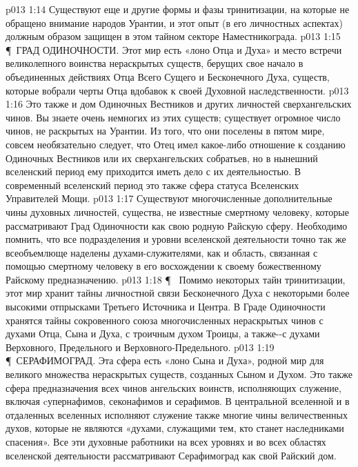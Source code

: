 \vs p013 1:14 Существуют еще и другие формы и фазы тринитизации, на которые не обращено внимание народов Урантии, и этот опыт (в его личностных аспектах) должным образом защищен в этом тайном секторе Наместникограда.
\vs p013 1:15 \P\ \bibnobreakspace ГРАД ОДИНОЧНОСТИ. Этот мир есть «лоно Отца и Духа» и место встречи великолепного воинства нераскрытых существ, берущих свое начало в объединенных действиях Отца Всего Сущего и Бесконечного Духа, существ, которые вобрали черты Отца вдобавок к своей Духовной наследственности.
\vs p013 1:16 Это также и дом Одиночных Вестников и других личностей сверхангельских чинов. Вы знаете очень немногих из этих существ; существует огромное число чинов, не раскрытых на Урантии. Из того, что они поселены в пятом мире, совсем необязательно следует, что Отец имел какое\hyp{}либо отношение к созданию Одиночных Вестников или их сверхангельских собратьев, но в нынешний вселенский период ему приходится иметь дело с их деятельностью. В современный вселенский период это также сфера статуса Вселенских Управителей Мощи.
\vs p013 1:17 Существуют многочисленные дополнительные чины духовных личностей, существа, не известные смертному человеку, которые рассматривают Град Одиночности как свою родную Райскую сферу. Необходимо помнить, что все подразделения и уровни вселенской деятельности точно так же всеобъемлюще наделены духами\hyp{}служителями, как и область, связанная с помощью смертному человеку в его восхождении к своему божественному Райскому предназначению.
\vs p013 1:18 \P\  Помимо некоторых тайн тринитизации, этот мир хранит тайны личностной связи Бесконечного Духа с некоторыми более высокими отпрысками Третьего Источника и Центра. В Граде Одиночности хранятся тайны сокровенного союза многочисленных нераскрытых чинов с духами Отца, Сына и Духа, с троичным духом Троицы, а также\hyp{}\hyp{}с духами Верховного, Предельного и Верховного\hyp{}Предельного.
\vs p013 1:19 \P\ \bibnobreakspace СЕРАФИМОГРАД. Эта сфера есть «лоно Сына и Духа», родной мир для великого множества нераскрытых существ, созданных Сыном и Духом. Это также сфера предназначения всех чинов ангельских воинств, исполняющих служение, включая cупернафимов, секонафимов и серафимов. В центральной вселенной и в отдаленных вселенных исполняют служение также многие чины величественных духов, которые не являются «духами, служащими тем, кто станет наследниками спасения». Все эти духовные работники на всех уровнях и во всех областях вселенской деятельности рассматривают Серафимоград как свой Райский дом.
